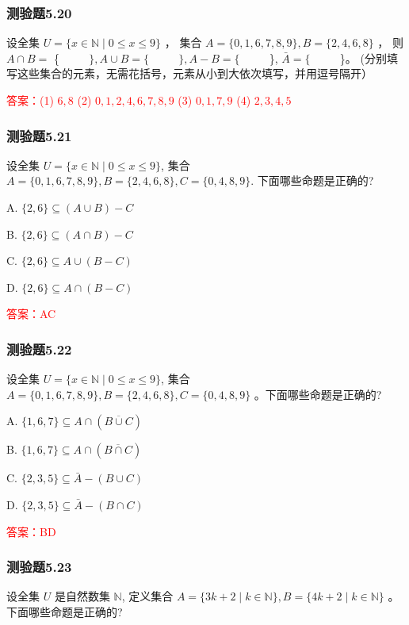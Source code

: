 \documentclass[UTF8, heading=true]{ctexart}
\begin{document}
\subsubsection{测验题5.20}

设全集 $U=\{x \in \mathbb{N} \mid 0 \leq x \leq 9\}$ ，
集合 $A=\{0,1,6,7,8,9\}, B=\{2,4,6,8\}$ ，
则 $A \cap B=$ \{ $\qquad$ $\}, A \cup B=\{$ $\qquad$ $\}, A-B=\{$ $\qquad$ \}, $\bar{A}=\{$ $\qquad$ \}。 (分别填写这些集合的元素，无需花括号，元素从小到大依次填写，并用逗号隔开）

\textcolor{red}{答案：(1) $6,8$
(2) $0,1,2,4,6,7,8,9$
(3) $0,1,7,9$
(4) $2,3,4,5$}


\subsubsection{测验题5.21}

设全集 $U=\{x \in \mathbb{N} \mid 0 \leq x \leq 9\}$, 集合 $A=\{0,1,6,7,8,9\}, B=\{2,4,6,8\}, C=\{0,4,8,9\}$. 下面哪些命题是正确的?

A. $\{2,6\} \subseteq(A \cup B)-C$

B. $\{2,6\} \subseteq(A \cap B)-C$

C. $\{2,6\} \subseteq A \cup(B-C)$

D. $\{2,6\} \subseteq A \cap(B-C)$

\textcolor{red}{答案：AC}

\subsubsection{测验题5.22}

设全集 $U=\{x \in \mathbb{N} \mid 0 \leq x \leq 9\}$, 
集合 $A=\{0,1,6,7,8,9\}, B=\{2,4,6,8\}, C=\{0,4,8,9\}$ 。下面哪些命题是正确的?

A. $\{1,6,7\} \subseteq A \cap(\overline{B \cup C})$

B. $\{1,6,7\} \subseteq A \cap(\overline{B \cap C})$

C. $\{2,3,5\} \subseteq \bar{A}-(B \cup C)$

D. $\{2,3,5\} \subseteq \bar{A}-(B \cap C)$

\textcolor{red}{答案：BD}

\subsubsection{测验题5.23}
设全集 $U$ 是自然数集 $\mathbb{N}$, 定义集合 $A=\{3 k+2 \mid k \in \mathbb{N}\}, B=\{4 k+2 \mid k \in \mathbb{N}\}$ 。下面哪些命题是正确的?
\end{document}
